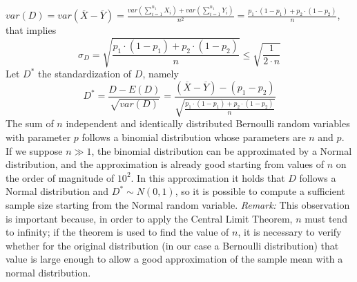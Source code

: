 \documentclass[14pt]{article}
\begin{document}
 $var(D)=var \left (\overline{X}-\overline{Y}\right )=\frac{var \left (\sum_{i=1}^{n_{1}} X_i \right )+var\left(\sum_{i=1}^{n_{1}} Y_i \right )}{n^2}=\frac{p_{1}\cdot(1-p_{1})+p_{2}\cdot(1-p_{2})}{n}$, that implies\\
 \begin{equation}
\sigma_{D}=\sqrt{\frac{p_{1}\cdot(1-p_{1})+p_{2}\cdot(1-p_{2})}{n}}\leq \sqrt{\frac{1}{2\cdot n}}
\end{equation}
\newline
\newline
Let $D^{*}$  the standardization of $D$, namely \\ 
\begin{equation}
D^{*}=\frac{D-E(D)}{\sqrt{var(D)}}=\frac{(\overline{X}-\overline{Y})-(p_{1}-p_{2})}{\sqrt{\frac{p_{1}\cdot(1-p_{1})+p_{2}\cdot(1-p_{2})}{n}}}
\end{equation}
\newline
The sum of $n$ independent and identically distributed Bernoulli random variables with  parameter  $p$ follows a binomial distribution whose parameters are $n$ and $p$.
If we suppose $n\gg1$, the binomial distribution can be approximated by a Normal distribution, and the approximation is already good starting from values of $n$ on the order of magnitude of $10^{2}$.  In this approximation it holds that  $D$ follows a Normal distribution and $D^{*}\sim N(0,1)$, so it is possible to compute a sufficient sample size starting from the Normal random variable. \textit{Remark: } This observation is important because, in order to apply the Central Limit Theorem, 
$n$ must tend to infinity; if the theorem is used to find the value of $n$, it is necessary to verify whether for the original distribution (in our case a Bernoulli distribution) that value is large enough to allow a good approximation of the sample mean with a normal distribution.\\
\end{document}
